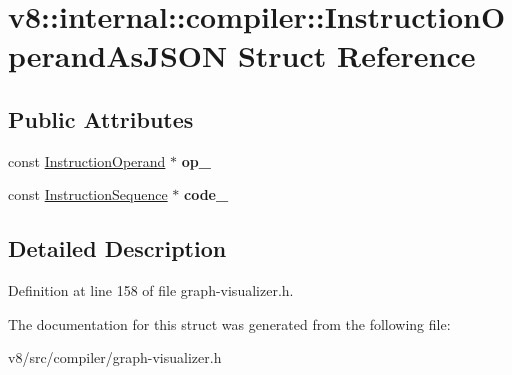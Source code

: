 \hypertarget{structv8_1_1internal_1_1compiler_1_1InstructionOperandAsJSON}{}\section{v8\+:\+:internal\+:\+:compiler\+:\+:Instruction\+Operand\+As\+J\+S\+ON Struct Reference}
\label{structv8_1_1internal_1_1compiler_1_1InstructionOperandAsJSON}
\subsection*{Public Attributes}
\begin{DoxyCompactItemize}
\item 
\mbox{\label{structv8_1_1internal_1_1compiler_1_1InstructionOperandAsJSON_a37cb82591c5a1fe065b2ca6a49035988}} 
const \mbox{\hyperlink{classv8_1_1internal_1_1compiler_1_1InstructionOperand}{Instruction\+Operand}} $\ast$ {\bfseries op\+\_\+}
\item 
\mbox{\label{structv8_1_1internal_1_1compiler_1_1InstructionOperandAsJSON_a16af3880fc0f5fc2d5d108b8abdfcfa5}} 
const \mbox{\hyperlink{classv8_1_1internal_1_1compiler_1_1InstructionSequence}{Instruction\+Sequence}} $\ast$ {\bfseries code\+\_\+}
\end{DoxyCompactItemize}


\subsection{Detailed Description}


Definition at line 158 of file graph-\/visualizer.\+h.



The documentation for this struct was generated from the following file\+:\begin{DoxyCompactItemize}
\item 
v8/src/compiler/graph-\/visualizer.\+h\end{DoxyCompactItemize}
